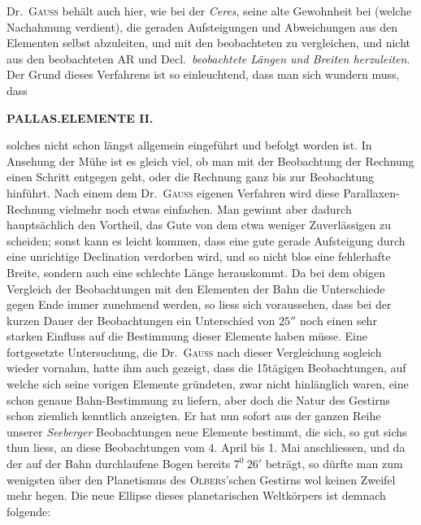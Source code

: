 Dr.\ \textsc{Gauss} behält auch hier, wie bei der \textit{Ceres}, seine alte Gewohnheit bei (welche Nachahmung verdient), die geraden Aufsteigungen und Abweichungen aus den Elementen selbst abzuleiten, und mit den beobachteten zu vergleichen, und nicht aus den beobachteten AR und Decl.\ \textit{beobachtete Längen und Breiten herzuleiten}. Der Grund dieses Verfahrens ist so einleuchtend, dass man sich wundern muss, dass\par
{}
\clearpage
\clearpage
\thispagestyle{empty}
\noindent{}%
%
\parbox[t]{\dimexpr\linewidth-24mm\relax}{\centering\footnotesize\bfseries PALLAS.\quad ELEMENTE II.\par}%
\makebox[12mm][r]{}\par\nobreak\medskip
\noindent solches nicht schon längst allgemein eingeführt und befolgt worden ist. In Ansehung der Mühe ist es gleich viel, ob man mit der Beobachtung der Rechnung einen Schritt entgegen geht, oder die Rechnung ganz bis zur Beobachtung hinführt. Nach einem dem Dr.\ \textsc{Gauss} eigenen Verfahren wird diese Parallaxen-Rechnung vielmehr noch etwas einfachen. Man gewinnt aber dadurch hauptsächlich den Vortheil, das Gute von dem etwa weniger Zuverlässigen zu scheiden; sonst kann es leicht kommen, dass eine gute gerade Aufsteigung durch eine unrichtige Declination verdorben wird, und so nicht blos eine fehlerhafte Breite, sondern auch eine schlechte Länge herauskommt. Da bei dem obigen Vergleich der Beobachtungen mit den Elementen der Bahn die Unterschiede gegen Ende immer zunehmend werden, so liess sich voraussehen, dass bei der kurzen Dauer der Beobachtungen ein Unterschied von $25''$ noch einen sehr starken Einfluss auf die Bestimmung dieser Elemente haben müsse. Eine fortgesetzte Untersuchung, die Dr.\ \textsc{Gauss} nach dieser Vergleichung sogleich wieder vornahm, hatte ihm auch gezeigt, dass die 15tägigen Beobachtungen, auf welche sich seine vorigen Elemente gründeten, zwar nicht hinlänglich waren, eine schon genaue Bahn-Bestimmung zu liefern, aber doch die Natur des Gestirns schon ziemlich kenntlich anzeigten. Er hat nun sofort aus der ganzen Reihe unserer \textit{Seeberger} Beobachtungen neue Elemente bestimmt, die sich, so gut sichs thun liess, an diese Beobachtungen vom 4. April bis 1. Mai anschliessen, und da der auf der Bahn durchlaufene Bogen bereits $7^0\ 26'$ beträgt, so dürfte man zum wenigsten über den Planetismus des \textsc{Olbers}'schen Gestirns wol keinen Zweifel mehr hegen. Die neue Ellipse dieses planetarischen Weltkörpers ist demnach folgende:
